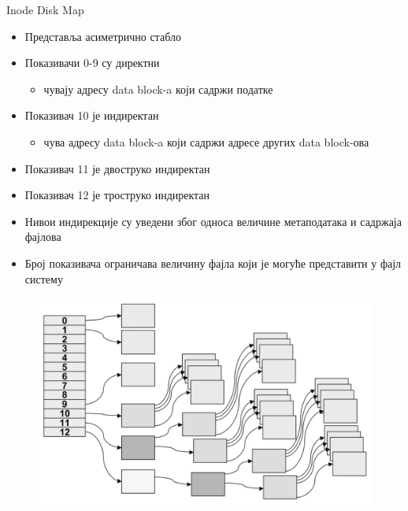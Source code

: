 \documentclass[xcolor=table]{beamer}
\begin{document}
    \begin{frame}[allowframebreaks]{Inode Disk Map}
        \begin{itemize}
            \item Представља асиметрично стабло
            \item Показивачи 0-9 су директни
            \begin{itemize}
                \item чувају адресу data block-a који садржи податке
            \end{itemize}
            \item Показивач 10 је индиректан
            \begin{itemize}
                \item чува адресу data block-a који садржи адресе других data block-ова
            \end{itemize}
            \item Показивач 11 је двоструко индиректан
            \item Показивач 12 је троструко индиректан
            \item Нивои индирекције су уведени због односа величине метаподатака и садржаја фајлова
            \item Број показивача ограничава величину фајла који је могуће представити у фајл систему
        \end{itemize}
        
        \framebreak
        
        \begin{figure}
            \centering
            \includegraphics[width=\textwidth,height=0.8\textheight,keepaspectratio]{images/inode_data_pointers.png}
            \label{fig:inode_data_pointers.png}
        \end{figure}
    \end{frame}
    
\end{document}
